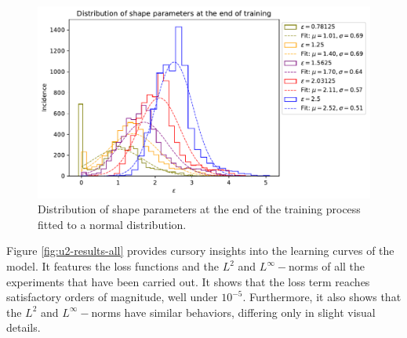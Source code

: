 \documentclass[12pt]{report} %
\begin{document}
\begin{figure}[h]
  \includegraphics[width=\textwidth]{imagenes/experiments/1d/statistical_1d_full_scheduler_interpolation/distribution_of_shape_parameters_at_end_of_training.pdf}
  \caption{Distribution of shape parameters at the end of the training process fitted to a normal distribution.}
  \label{fig:u2-results-shape-parameters}
\end{figure}

Figure \ref{fig:u2-results-all} provides cursory insights into the learning curves of the model. It features the loss functions and the $L^2$ and $L^\infty-$norms of all the experiments that have been carried out. It shows that the loss term reaches satisfactory orders of magnitude, well under $10^{-5}$. Furthermore, it also shows that the $L^2$ and $L^\infty-$norms have similar behaviors, differing only in slight visual details.
\end{document}
